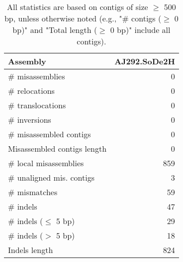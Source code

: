 \documentclass[12pt,a4paper]{article}
\begin{document}
\begin{table}[ht]
\begin{center}
\caption{All statistics are based on contigs of size $\geq$ 500 bp, unless otherwise noted (e.g., "\# contigs ($\geq$ 0 bp)" and "Total length ($\geq$ 0 bp)" include all contigs).}
\begin{tabular}{|l*{1}{|r}|}
\hline
Assembly & AJ292.SoDe2H \\ \hline
\# misassemblies & 0 \\ \hline
\hspace{5mm}\# relocations & 0 \\ \hline
\hspace{5mm}\# translocations & 0 \\ \hline
\hspace{5mm}\# inversions & 0 \\ \hline
\# misassembled contigs & 0 \\ \hline
Misassembled contigs length & 0 \\ \hline
\# local misassemblies & 859 \\ \hline
\# unaligned mis. contigs & 3 \\ \hline
\# mismatches & 59 \\ \hline
\# indels & 47 \\ \hline
\hspace{5mm}\# indels ($\leq$ 5 bp) & 29 \\ \hline
\hspace{5mm}\# indels ($>$ 5 bp) & 18 \\ \hline
Indels length & 824 \\ \hline
\end{tabular}
\end{center}
\end{table}
\end{document}
